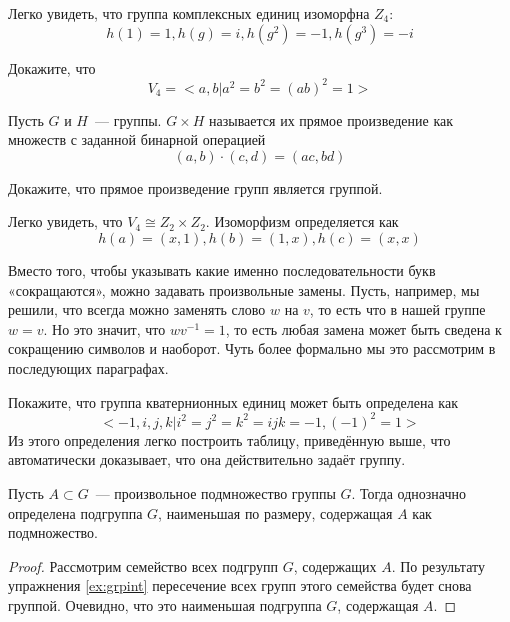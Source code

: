 \begin{example}
	Легко увидеть, что группа комплексных единиц изоморфна $Z_4$:
	\[
	h(1) = 1, h(g) = i, h(g^2) = -1, h(g^3) = -i
	\]
\end{example}

\begin{exercise}
	Докажите, что
	\[
	V_4 = <a, b | a^2 = b^2 = (ab)^2 = 1>
	\]
\end{exercise}

\begin{definition}
	Пусть $G$ и $H$~— группы.  $G\times H$ называется их прямое произведение как множеств с заданной бинарной операцией
	\[
	(a, b) \cdot (c, d) = (ac, bd)
	\]
\end{definition}

\begin{exercise}
	Докажите, что прямое произведение групп является группой.
\end{exercise}

\begin{example}
	Легко увидеть, что $V_4 \cong Z_2 \times Z_2$. Изоморфизм определяется как
	\[
	h(a) = (x, 1), h(b) = (1, x), h(c) = (x, x)
	\]
\end{example}

Вместо того, чтобы указывать какие именно последовательности букв «сокращаются», можно задавать произвольные замены. Пусть, например, мы решили, что всегда можно заменять слово $w$ на $v$, то есть что в нашей группе $w=v$. Но это значит, что $wv^{-1} = 1$, то есть любая замена может быть сведена к сокращению символов и наоборот. Чуть более формально мы это рассмотрим в последующих параграфах.

\begin{exercise}
	Покажите, что группа кватернионных единиц может быть определена как
	\[
	<-1, i, j, k | i^2 = j^2 = k^2 = ijk = -1, (-1)^2 = 1>
	\]
	Из этого определения легко построить таблицу, приведённую выше, что автоматически доказывает, что она действительно задаёт группу.
\end{exercise}

\begin{thm}
	Пусть $A\subset G$~— произвольное подмножество группы $G$. Тогда однозначно определена подгруппа $G$, наименьшая по размеру, содержащая $A$ как подмножество.
\end{thm}
\begin{proof}
	Рассмотрим семейство всех подгрупп $G$, содержащих $A$. По результату упражнения \ref{ex:grpint} пересечение всех групп этого семейства будет снова группой. Очевидно, что это наименьшая подгруппа $G$, содержащая $A$.
\end{proof}

